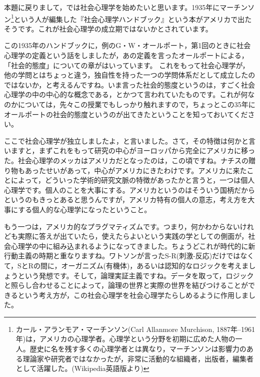 \documentclass{ltjsbook}
\begin{document}
本題に戻りまして，では社会心理学を始めたいと思います。1935年にマーチンソン\footnote{カール・アランモア・マーチンソン(Carl Allanmore Murchison, 1887年–1961年)は，アメリカの心理学者。心理学という分野を初期に広めた人物の一人。歴史に名を残す多くの心理学者とは異なり，マーチンソンは影響力のある理論家や研究者ではなかったが，非常に活動的な組織者，出版者，編集者として活躍した。(Wikipedia英語版より)}という人が編集した『社会心理学ハンドブック』という本\parencite{Murchinson}がアメリカで出たそうです。これが社会心理学の成立期ではないかとされています。

この1935年のハンドブックに，例のG・W・オールポート，第1回のときに社会心理学の定義という話をしましたが，あの定義を言ったオールポートによる，「社会的態度」についての章がはいっています。
これをもって社会心理学が，他の学問とはちょっと違う，独自性を持った一つの学問体系だとして成立したのではないか，と考えるんですね。いま言った社会的態度というのは，すごく社会心理学の中の中心的な概念である，とかつて言われていたものです。これが何なのかについては，先々この授業でもしっかり触れますので，ちょっとこの35年にオールポートの社会的態度というのが出てきたということを知っておいてください。

ここで社会心理学が独立しましたよ，と言いました。さて，その特徴は何かと言いますと，まずこれをもって研究の中心がヨーロッパから完全にアメリカに移った。社会心理学のメッカはアメリカだとなったのは，この頃ですね。ナチスの贈り物もあったせいがあって，中心がアメリカにきたわけです。アメリカに来たことによって，どういった学術的研究文脈の特徴があったかと言うと，一つは個人心理学です。個人のことを大事にする。アメリカというのはそういう国柄だからというのもきっとあると思うんですが，アメリカ特有の個人の意志，考え方を大事にする個人的な心理学になったということ。

もう一つは，アメリカ的なプラグマティズムです。つまり，何かわからないけれども実際に答えが出ていたら，使えたらよいという実践の学としての側面が，社会心理学の中に組み込まれるようになってきました。ちょうどこれが時代的に新行動主義の時期と重なりますね。ワトソンが言ったS-R(刺激-反応)だけではなくて，SとRの間に，オーガニズム(有機体)，あるいは認知的なロジックを考えましょうという発想です。そして，論理実証主義ですね。データを取って，ロジックと照らし合わせることによって，論理の世界と実際の世界を結びつけることができるという考え方が，この社会心理学を社会心理学たらしめるように作用しました。
\end{document}
